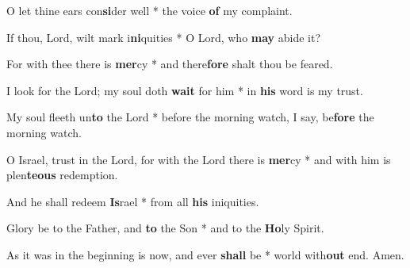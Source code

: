 \begin{multicols}{2}
	O let thine ears con\textbf{si}der well * the voice \textbf{of} my complaint.
	
	If thou, Lord, wilt mark i\textbf{ni}quities * O Lord, who \textbf{may} abide it?
	
	For with thee there is \textbf{mer}cy  * and there\textbf{fore} shalt thou be feared.
	
	I look for the Lord; my soul doth \textbf{wait} for him * in \textbf{his} word is my trust.
	
	My soul fleeth un\textbf{to} the Lord * before the morning watch, I say, be\textbf{fore} the morning watch.
	
	O Israel, trust in the Lord, for with the Lord there is \textbf{mer}cy * and with him is plen\textbf{teous} redemption.
	
	And he shall redeem \textbf{Is}rael * from all \textbf{his} iniquities.
	
	Glory be to the Father, and \textbf{to} the Son * and to the \textbf{Ho}ly Spirit.
	
	As it was in the beginning is now, and ever \textbf{shall} be * world with\textbf{out} end. Amen.
\end{multicols}